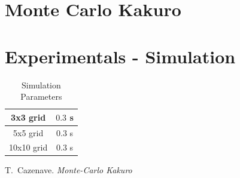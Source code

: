 \documentclass[journal, a4paper]{IEEEtran}
\begin{document}
\section{Monte Carlo Kakuro}

\section{Experimentals - Simulation}
    \begin{table}[!hbt]
        \begin{center}
        \caption{Simulation Parameters}
        \label{tab:simParameters}
        \begin{tabular}{|c|c|}
            \hline
           3x3 grid & $0.3$ s \\
            \hline
           5x5 grid & $0.3$ s \\
            \hline
           10x10 grid & $0.3$ s \\
            \hline
        \end{tabular}
        \end{center}
    \end{table}


\begin{thebibliography}{5}
    T.~Cazenave. {\em Monte-Carlo Kakuro}
\end{thebibliography}
\end{document}
